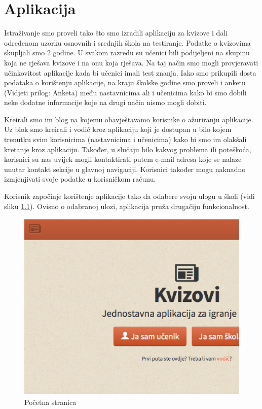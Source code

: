 \documentclass{scrreprt}
\begin{document}
\chapter{Aplikacija}

Istraživanje smo proveli tako što smo izradili aplikaciju za kvizove i dali
određenom uzorku osnovnih i srednjih škola na testiranje. Podatke o kvizovima
skupljali smo 2 godine. U svakom razredu su učenici bili podijeljeni na skupinu
koja ne rješava kvizove i na onu koja rješava. Na taj način smo mogli
provjeravati učinkovitost aplikacije kada bi učenici imali test znanja. Iako
smo prikupili dosta podataka o korištenju aplikacije, na kraju školske godine
smo proveli i anketu (Vidjeti prilog: Anketa) među nastavnicima ali i učenicima
kako bi smo dobili neke dodatne informacije koje na drugi način nismo mogli
dobiti.

Kreirali smo im blog na kojemu obavještavamo korisnike o ažuriranju aplikacije.
Uz blok smo kreirali i vodič kroz aplikaciju koji je dostupan u bilo kojem
trenutku svim korisnicima (nastavnicima i učenicima) kako bi smo im olakšali
kretanje kroz aplikaciju. Također, u slučaju bilo kakvog problema ili
poteškoća, korisnici su nas uvijek mogli kontaktirati putem e-mail adresa koje
se nalaze unutar kontakt sekcije u glavnoj navigaciji. Korisnici također mogu
naknadno izmjenjivati svoje podatke u korisničkom računu.

Korisnik započinje korištenje aplikacije tako da odabere svoju ulogu u školi
(vidi sliku \ref{fig:home}). Ovisno o odabranoj ulozi, aplikacija pruža drugačiju
funkcionalnost.

\begin{figure}[H]
  \includegraphics[width=\textwidth, clip=true, trim=0 7cm 0 0, fbox]{home}
  \caption{Početna stranica}
  \label{fig:home}
\end{figure}
\end{document}

